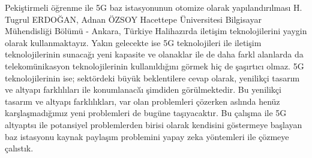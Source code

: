 
    \begin{abstract_online}{Pekiştirmeli öğrenme ile 5G baz istasyonunun otomize olarak yapılandırılması}{%
        H. Tugrul ERDOĞAN, Adnan ÖZSOY}{%
        }{%
        Hacettepe Üniversitesi Bilgisayar Mühendisliği Bölümü - Ankara, Türkiye}
    Halihazırda iletişim teknolojilerini yaygin olarak kullanmaktayız. Yakın gelecekte ise 5G teknolojileri ile iletişim teknolojilerinin sunacağı yeni kapasite ve olanaklar ile de daha farkl alanlarda da telekomünikasyon teknolojilerinin kullanıldığını görmek hiç de şaşırtıcı olmaz. 5G teknolojilerinin ise; sektördeki büyük beklentilere cevap olarak, yenilikçi tasarım ve altyapı farklılıları ile konumlanacă̆ı şimdiden görülmektedir. Bu yenilikçi tasarım ve altyapı farklılıkları, var olan problemleri çözerken aslında henüz karşlaşmadığımız yeni problemleri de bugüne taşıyacaktır. Bu çalışma ile 5G altyaptsı ile potansiyel problemlerden birisi olarak kendisini göstermeye başlayan baz istasyonu kaynak paylaşım problemini yapay zeka yöntemleri ile çözmeye çalıstık. 
    
    \end{abstract_online}
    